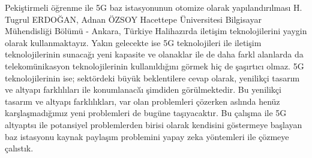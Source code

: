 
    \begin{abstract_online}{Pekiştirmeli öğrenme ile 5G baz istasyonunun otomize olarak yapılandırılması}{%
        H. Tugrul ERDOĞAN, Adnan ÖZSOY}{%
        }{%
        Hacettepe Üniversitesi Bilgisayar Mühendisliği Bölümü - Ankara, Türkiye}
    Halihazırda iletişim teknolojilerini yaygin olarak kullanmaktayız. Yakın gelecekte ise 5G teknolojileri ile iletişim teknolojilerinin sunacağı yeni kapasite ve olanaklar ile de daha farkl alanlarda da telekomünikasyon teknolojilerinin kullanıldığını görmek hiç de şaşırtıcı olmaz. 5G teknolojilerinin ise; sektördeki büyük beklentilere cevap olarak, yenilikçi tasarım ve altyapı farklılıları ile konumlanacă̆ı şimdiden görülmektedir. Bu yenilikçi tasarım ve altyapı farklılıkları, var olan problemleri çözerken aslında henüz karşlaşmadığımız yeni problemleri de bugüne taşıyacaktır. Bu çalışma ile 5G altyaptsı ile potansiyel problemlerden birisi olarak kendisini göstermeye başlayan baz istasyonu kaynak paylaşım problemini yapay zeka yöntemleri ile çözmeye çalıstık. 
    
    \end{abstract_online}
    